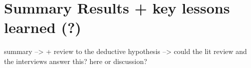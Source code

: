 \section{Summary Results + key lessons learned (?)}































summary
--> + review to the deductive hypothesis --> could the lit review and the interviews answer this? here or discussion?































